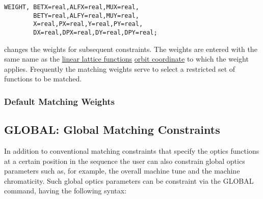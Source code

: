 \begin{verbatim}
WEIGHT, BETX=real,ALFX=real,MUX=real, 
        BETY=real,ALFY=real,MUY=real, 
        X=real,PX=real,Y=real,PY=real, 
        DX=real,DPX=real,DY=real,DPY=real;
\end{verbatim}

changes the weights for subsequent constraints.
The weights are entered with the same name as the
\href{../Introduction/tables.html#linear}{linear lattice functions}
\href{../Introduction/closed_orbit.html}{orbit coordinate} 
to which the weight applies.
Frequently the matching weights serve to select a restricted
set of functions to be matched.

\subsubsection{Default Matching Weights}


\subsection{GLOBAL: Global Matching Constraints}
\label{subsec:match_con_global}

In addition to conventional matching constraints that specify the optics 
functions at a certain position in the sequence the user can also constrain 
global optics parameters such as, for example, the overall machine tune
and the machine chromaticity. Such global optics parameters can be
constraint via the  GLOBAL command, having the following syntax:

